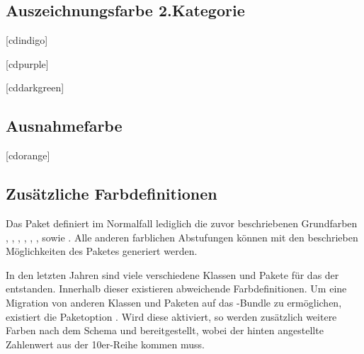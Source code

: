 \begin{Declaration*}{}
\subsection{Auszeichnungsfarbe 2.Kategorie}
\begin{Declaration}{[cdindigo]}
\begin{Declaration}{[cdpurple]}
\begin{Declaration}{[cddarkgreen]}
\end{Declaration}
\end{Declaration}
\end{Declaration}


\subsection{Ausnahmefarbe}
\begin{Declaration}{[cdorange]}
\printdeclarationlist%
\end{Declaration}


\subsection{Zusätzliche Farbdefinitionen}
Das Paket  definiert im Normalfall lediglich die zuvor 
beschriebenen Grundfarben , , , 
, , ,  sowie 
. Alle anderen farblichen Abstufungen können mit den beschrieben 
Möglichkeiten des Paketes  generiert werden.

\begin{Declaration}{}
\printdeclarationlist%
%
In den letzten Jahren sind viele verschiedene Klassen und Pakete für das \CD 
der \TnUD entstanden. Innerhalb dieser existieren abweichende Farbdefinitionen. 
Um eine Migration von anderen Klassen und Paketen auf das \TUDScript-Bundle zu 
ermöglichen, existiert die Paketoption . Wird diese aktiviert, so 
werden zusätzlich weitere Farben nach dem Schema  
und  bereitgestellt, wobei der hinten angestellte 
Zahlenwert aus der 10er-Reihe kommen muss.
\end{Declaration}




\end{Declaration*}
